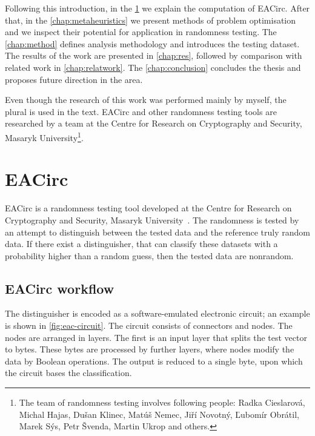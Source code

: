 \documentclass[
  print, %
  Table,   %
  nolof,     %
  nolot,     %
  11pt, %
  oneside  %
]{fithesis3}
\begin{document}
Following this introduction, in the \cref{chap:eacirc} we explain the computation of EACirc. After that, in the \cref{chap:metaheuristics} we present methods of problem optimisation and we inspect their potential for application in randomness testing. The \cref{chap:method} defines analysis methodology and introduces the testing dataset. The results of the work are presented in \cref{chap:res}, followed by comparison with related work in \cref{chap:relatwork}. The \cref{chap:conclusion} concludes the thesis and proposes future direction in the area. %

Even though the research of this work was performed mainly by myself, the plural is used in the text. EACirc and other randomness testing tools are researched by a team at the Centre for Research on Cryptography and Security, Masaryk University\footnote{The team of randomness testing involves following people: Radka Cieslarová, Michal Hajas, Dušan Klinec, Matúš Nemec, Jiří Novotný, Ľubomír Obrátil, Marek Sýs, Petr Švenda, Martin Ukrop and others.}.



\chapter{EACirc}
\label{chap:eacirc}

EACirc is a randomness testing tool developed at the Centre for Research on Cryptography and Security, Masaryk University~\cite{EACirc}. The randomness is tested by an attempt to distinguish between the tested data and the reference truly random data. If there exist a distinguisher, that can classify these datasets with a probability higher than a random guess, then the tested data are nonrandom.

\section{EACirc workflow}
\label{sec:eac-comp}

The distinguisher is encoded as a software-emulated electronic circuit; an example is shown in \cref{fig:eac-circuit}. The circuit consists of connectors and nodes. The nodes are arranged in layers. The first is an input layer that splits the test vector to bytes. These bytes are processed by further layers, where nodes modify the data by Boolean operations. The output is reduced to a single byte, upon which the circuit bases the classification.
\end{document}
